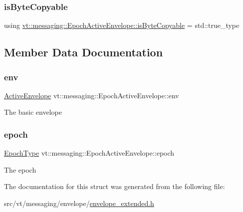 \subsubsection{\texorpdfstring{is\+Byte\+Copyable}{isByteCopyable}}
{\footnotesize\ttfamily using \hyperlink{structvt_1_1messaging_1_1_epoch_active_envelope_acc191b9182733db346b508d4c77c2e58}{vt\+::messaging\+::\+Epoch\+Active\+Envelope\+::is\+Byte\+Copyable} =  std\+::true\+\_\+type}



\subsection{Member Data Documentation}
\mbox{\label{structvt_1_1messaging_1_1_epoch_active_envelope_aba54092b517b6ade61d737d78aed8d3e}} 
\subsubsection{\texorpdfstring{env}{env}}
{\footnotesize\ttfamily \hyperlink{structvt_1_1messaging_1_1_active_envelope}{Active\+Envelope} vt\+::messaging\+::\+Epoch\+Active\+Envelope\+::env}

The basic envelope \mbox{\label{structvt_1_1messaging_1_1_epoch_active_envelope_ab2888fbf6456065ddf86656a1ed09329}} 
\subsubsection{\texorpdfstring{epoch}{epoch}}
{\footnotesize\ttfamily \hyperlink{namespacevt_a985a5adf291c34a3ca263b3378388236}{Epoch\+Type} vt\+::messaging\+::\+Epoch\+Active\+Envelope\+::epoch}

The epoch 

The documentation for this struct was generated from the following file\+:\begin{DoxyCompactItemize}
\item 
src/vt/messaging/envelope/\hyperlink{envelope__extended_8h}{envelope\+\_\+extended.\+h}\end{DoxyCompactItemize}
